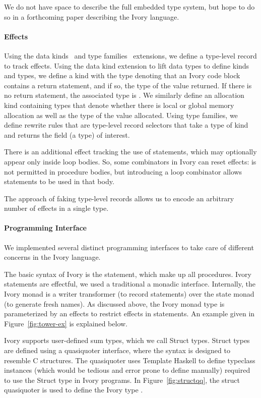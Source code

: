 We do not have space to describe the full embedded type system, but hope to do
so in a forthcoming paper describing the Ivory language.

\paragraph{Effects}

Using the data kinds~\cite{datakinds} and type
families~\cite{typefamilies} extensions, we define a type-level record to track
effects.  Using the data kind extension to lift data types to define kinds and
types, we define a kind  with the type  denoting that an
Ivory code block contains a return statement, and if so, the type of the value
returned.  If there is no return statement, the associated type is .
We similarly define an allocation kind containing types that denote whether
there is local or global memory allocation as well as the type of the value
allocated.  Using type families, we define rewrite rules that are type-level
record selectors that take a type of kind  and returns the field (a
type) of interest.

There is an additional effect tracking the use of
 statements, which may optionally appear only inside loop bodies.
So, some combinators in Ivory can reset effects:
 is not permitted in procedure bodies, but introducing a loop
combinator allows  statements to be used in that body.

The approach of faking
type-level records allows us to encode an arbitrary number of effects in a
single type.


\paragraph{Programming Interface}

We implemented several distinct programming interfaces to take care of different
concerns in the Ivory language.

The basic syntax of Ivory is the statement, which make up all procedures.
Ivory statements are effectful, we used a traditional a monadic interface.
Internally, the Ivory monad is a writer transformer (to record
statements) over the state monad (to generate fresh names). As discussed above,
the Ivory monad type is parameterized by an effects to restrict effects in
statements. An example given in Figure~\ref{fig:tower-ex} is explained below.

Ivory supports user-defined sum types, which we call Struct types.  Struct types
are defined using a quasiquoter\cite{ghc-quasiquoter} interface, where the
syntax is designed to resemble C structures. The quasiquoter uses Template
Haskell\cite{ghc-templatehaskell} to define typeclass instances (which would be
tedious and error prone to define manually) required to use the Struct type in
Ivory programs. In Figure~\ref{fig:structqq}, the struct quasiquoter is used to
define the Ivory type .

